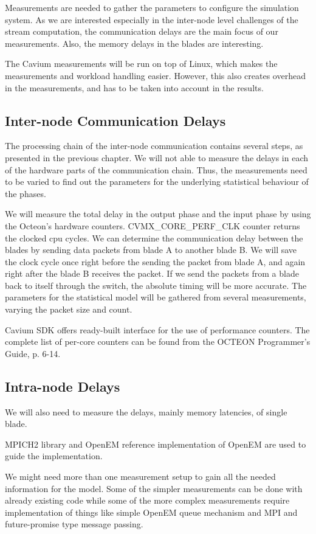 Measurements are needed to gather the parameters to configure the simulation system. As we are interested especially in the inter-node level challenges of the stream computation, the communication delays are the main focus of our measurements. Also, the memory delays in the blades are interesting.

The Cavium measurements will be run on top of Linux, which makes the measurements and workload handling easier. However, this also creates overhead in the measurements, and has to be taken into account in the results.

\subsection{Inter-node Communication Delays}
The processing chain of the inter-node communication contains several steps, as presented in the previous chapter. We will not able to measure the delays in each of the hardware parts of the communication chain. Thus, the measurements need to be varied to find out the parameters for the underlying statistical behaviour of the phases.

We will measure the total delay in the output phase and the input phase by using the Octeon's hardware counters. CVMX_CORE_PERF_CLK counter returns the clocked cpu cycles. We can determine the communication delay between the blades by sending data packets from blade A to another blade B. We will save the clock cycle once right before the sending the packet from blade A, and again right after the blade B receives the packet. If we send the packets from a blade back to itself through the switch, the absolute timing will be more accurate. The parameters for the statistical model will be gathered from several measurements, varying the packet size and count.

Cavium SDK offers ready-built interface for the use of performance counters. The complete list of per-core counters can be found from the OCTEON Programmer's Guide, p. 6-14.

\subsection{Intra-node Delays}
We will also need to measure the delays, mainly memory latencies, of single blade.

MPICH2 library and OpenEM reference implementation of OpenEM are used to guide the implementation.


We might need more than one measurement setup to gain all the needed information for the model. Some of the simpler measurements can be done with already existing code while some of the more complex measurements require implementation of things like simple OpenEM queue mechanism and MPI and future-promise type message passing.

